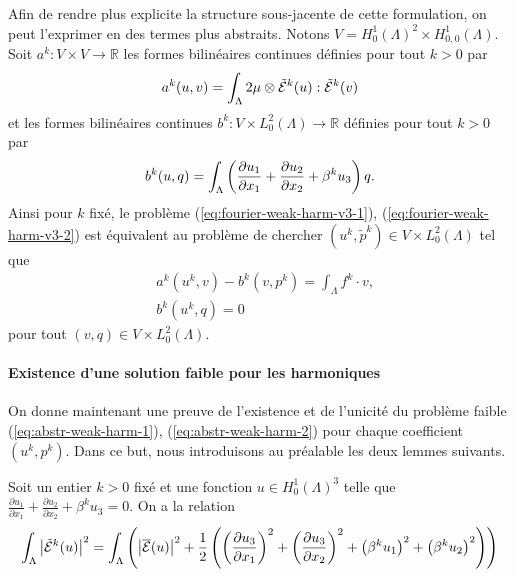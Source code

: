 Afin de rendre plus explicite la structure sous-jacente de cette
formulation, on peut l'exprimer en des termes plus abstraits. Notons
$V = H^1_0(\Lambda)^2\times H^1_{0,0}(\Lambda)$. Soit $a^k:V\times V
\to \mathbb R$ les formes bilinéaires continues définies pour tout $k
> 0$ par
\begin{equation}
  a^k(u,v) = \int_\Lambda
  2\mu\otimes\tilde{\mathcal E}^k(u):\tilde{\mathcal E}^k(v)
\end{equation}
et les formes bilinéaires continues $b^k:V\times L^2_0(\Lambda)\to\mathbb
R$ définies pour tout $k > 0$ par
\begin{equation}
  b^k(u, q) = \int_\Lambda \left( \frac{\partial u_1}{\partial x_1} +
    \frac{\partial u_2}{\partial x_2} + \beta^k u_3 \right)q.
\end{equation}
Ainsi pour $k$ fixé, le problème (\ref{eq:fourier-weak-harm-v3-1}),
(\ref{eq:fourier-weak-harm-v3-2}) est équivalent au problème de
chercher $(u^k,\tilde p^k)\in V \times L^2_0(\Lambda)$ tel que
\begin{align}
  &a^k(u^k,v) - b^k(v,p^k) = \int_\Lambda f^k\cdot v,\label{eq:abstr-weak-harm-1}\\
  & b^k(u^k, q) = 0\label{eq:abstr-weak-harm-2}
\end{align}
pour tout $(v, q)\in V \times L^2_0(\Lambda)$.

\paragraph{Existence d'une solution faible pour les harmoniques}
On donne maintenant une preuve de l'existence et de l'unicité du
problème faible (\ref{eq:abstr-weak-harm-1}),
(\ref{eq:abstr-weak-harm-2}) pour chaque coefficient $(u^k,p^k)$. Dans ce
but, nous introduisons au préalable les deux lemmes suivants.

\begin{lemme}\label{lem:1}
Soit un entier $k > 0$ fixé et une fonction $u \in H^1_0(\Lambda)^3$
telle que $\frac{\partial u_1}{\partial x_1} + \frac{\partial
  u_2}{\partial x_2} + \beta^k u_3 = 0$. On a la relation
\begin{equation}
\int_\Lambda \left\lvert \tilde{\mathcal E}^k(u) \right\rvert^2 = \int_\Lambda
\left( \left\lvert \overline{\mathcal E}(u) \right\rvert^2 +
  \frac{1}{2}\left( \left( \frac{\partial u_3}{\partial x_1} \right)^2 +
    \left( \frac{\partial u_3}{\partial x_2} \right)^2 +
    \left( \beta^k u_1 \right)^2  + \left( \beta^k u_2 \right)^2 \right) \right)
\end{equation}
\end{lemme}

